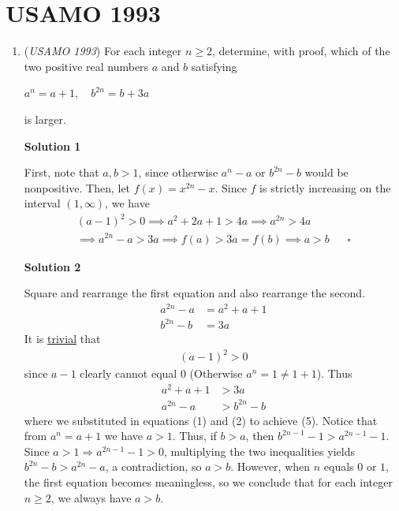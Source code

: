 \section{USAMO 1993}
        \begin{enumerate}
        	\item (\textit{USAMO 1993}) For each integer $n\ge2$, determine, with proof, which of the two positive real numbers $a$ and $b$ satisfying


 $a^n = a + 1, \quad b^{2n} = b + 3a$

 is larger.


 



\textbf{Solution 1}

First, note that $a, b > 1$, since otherwise $a^n-a$ or $b^{2n}-b$ would be nonpositive. Then, let $f(x)=x^{2n}-x$. Since $f$ is strictly increasing on the interval $(1, \infty)$, we have 
 \begin{align*} (a-1)^2>0 \implies a^2+2a+1>4a \implies a^{2n}>4a \\  \implies a^{2n}-a>3a \implies f(a)> 3a = f(b) \implies a> b && \square \end{align*}





\textbf{Solution 2}

Square and rearrange the first equation and also rearrange the second.
 \begin{align} a^{2n}-a&=a^2+a+1\\ b^{2n}-b&=3a \end{align}It is \href{https://artofproblemsolving.com/wiki/index.php?title=Trivial\_Inequality}{trivial} that
 \begin{align*} (a-1)^2 > 0 \tag{3} \end{align*}
since $a-1$ clearly cannot equal $0$ (Otherwise $a^n=1\neq 1+1$).  Thus
 \begin{align*} a^2+a+1&>3a \tag{4}\\ a^{2n}-a&>b^{2n}-b \tag{5} \end{align*}
where we substituted in equations (1) and (2) to achieve (5).  Notice that from $a^{n}=a+1$ we have $a>1$.  Thus, if $b>a$, then $b^{2n-1}-1>a^{2n-1}-1$.  Since $a>1\Rightarrow a^{2n-1}-1>0$, multiplying the two inequalities yields $b^{2n}-b>a^{2n}-a$, a contradiction, so $a> b$.  However, when $n$ equals $0$ or $1$, the first equation becomes meaningless, so we conclude that for each integer $n\ge 2$, we always have $a>b$.


\end{enumerate}
